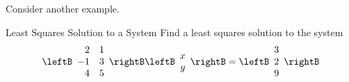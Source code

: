 Consider another example. 

\begin{example}{Least Squares Solution to a System}{}
Find a least squares solution to the system 
\begin{equation*}
\leftB
\begin{array}{rr}
2 & 1 \\ 
-1 & 3 \\ 
4 & 5
\end{array}
\rightB \leftB 
\begin{array}{c}
x \\ 
y
\end{array}
\rightB =\leftB 
\begin{array}{c}
3 \\ 
2 \\ 
9
\end{array}
\rightB
\end{equation*}
\end{example}


